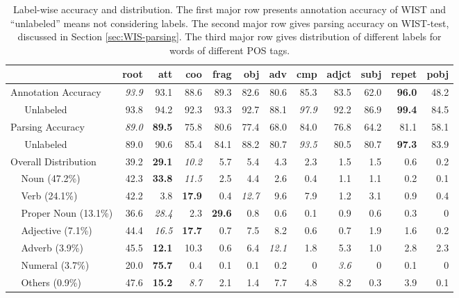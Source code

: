 \begin{table*}[!tb]
	\addtolength{\tabcolsep}{2pt}
	\begin{center}
			\begin{tabular}{l r r r r r r r r r r r}
			        \toprule
			        &root &att &coo &frag &obj &adv &cmp &adjct &subj &repet &pobj  \\
					\hline  
					Annotation Accuracy &\emph{93.9} &93.1 &88.6 &89.3 &82.6 &80.6 &85.3 &83.5 &62.0 &\textbf{96.0} &48.2 \\
					$~~~~~$ Unlabeled &93.8 &94.2 &92.3 &93.3 &92.7 &88.1 &\emph{97.9} &92.2 &86.9 &\textbf{99.4} &84.5 \\ 
					\hline 
					Parsing Accuracy &\emph{89.0} &\textbf{89.5} &75.8 &80.6 &77.4 &68.0 &84.0 &76.8 &64.2 &81.1 &58.1\\
					$~~~~~$ Unlabeled &89.0 &90.6 &85.4 &84.1 &88.2 &80.7 &\emph{93.5} &80.5 &80.7 &\textbf{97.3} &83.9 \\ 
					\hline  
					 Overall Distribution  &39.2 &\textbf{29.1} &\emph{10.2} &5.7 &5.4 &4.3 &2.3 &1.5 &1.5 &0.6 &0.2  \\
					$~~~~~$Noun (47.2\%) &42.3 &\textbf{33.8} &\emph{11.5} &2.5 &4.4 &2.6 &0.4 &1.1 &1.1 &0.2 &0.1 \\
					$~~~~~$Verb (24.1\%) &42.2 &3.8 &\textbf{17.9} &0.4 &\emph{12.7} &9.6 &7.9 &1.2 &3.1 &0.9 &0.4 \\
					$~~~~~$Proper Noun (13.1\%) &36.6 &\emph{28.4} &2.3 &\textbf{29.6} &0.8 &0.6 &0.1 &0.9 &0.6 &0.3 &0 \\
					$~~~~~$Adjective (7.1\%) &44.4 &\emph{16.5} &\textbf{17.7} &0.7 &7.5 &8.2 &0.6 &0.7 &1.9 &1.6 &0.2 \\
					$~~~~~$Adverb (3.9\%)&45.5 &\textbf{12.1} &10.3 &0.6 &6.4 &\emph{12.1} &1.8 &5.3 &1.0 &2.8 &2.3 \\
					$~~~~~$Numeral (3.7\%)&20.0 &\textbf{75.7} &0.4 &0.1 &0.1 &0.2 &0 &\emph{3.6} &0 &0.1 &0 \\
					$~~~~~$Others (0.9\%)&47.6 &\textbf{15.2} & \emph{8.7} &2.1 &1.4 &7.7 &4.8 &8.2 &0.3 &3.9 &0.1 \\
					\bottomrule
			\end{tabular}
			\caption{Label-wise accuracy and distribution. The first major row presents  annotation accuracy of WIST and  ``unlabeled'' means not considering labels. The second major row gives parsing accuracy on WIST-test, discussed in Section \ref{sec:WIS-parsing}. The third major row gives distribution of different labels for words of different POS tags. }

			\label{table:label distribution}
	\end{center}
\end{table*} 
